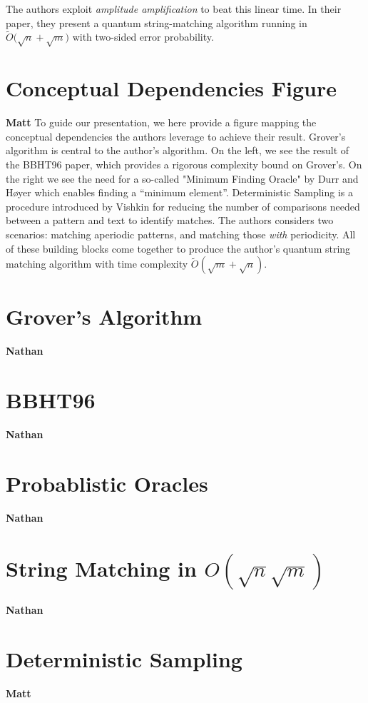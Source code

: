 \documentclass[11pt]{article}
\begin{document}
The authors exploit \textit{amplitude amplification} to beat this linear time. In their paper, they present a quantum string-matching algorithm running in \(\widetilde{O}\bigl(\sqrt{n} + \sqrt{m}\bigr)\) with two-sided error probability.

\section*{Conceptual Dependencies Figure}
\textbf{Matt} \linebreak
To guide our presentation, we here provide a figure mapping the conceptual dependencies the authors leverage to achieve their result.
Grover's algorithm is central to the author's algorithm. On the left, we see the result of the BBHT96 paper, which provides a rigorous complexity bound on Grover's. On the right we see the need for a so-called "Minimum Finding Oracle" by Durr and Høyer which enables finding a ``minimum element''. Deterministic Sampling is a procedure introduced by Vishkin for reducing the number of comparisons needed between a pattern and text to identify matches. The authors considers two scenarios: matching aperiodic patterns, and matching those \textit{with} periodicity.
All of these building blocks come together to produce the author's quantum string matching algorithm with time complexity \(\widetilde{O}(\sqrt{m} + \sqrt{n})\).

\section*{Grover's Algorithm}
\textbf{Nathan} \linebreak
\section*{BBHT96}
\textbf{Nathan} \linebreak
\section*{Probablistic Oracles}
\textbf{Nathan} \linebreak
\section*{String Matching in \(O(\sqrt{n} \sqrt{m})\)}
\textbf{Nathan} \linebreak

\section*{Deterministic Sampling}
\textbf{Matt}\linebreak
\end{document}
